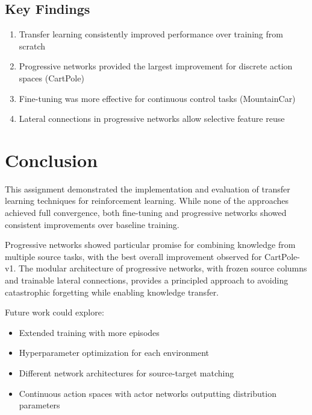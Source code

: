 \documentclass[11pt,a4paper]{article}
\begin{document}
\subsection{Key Findings}

\begin{enumerate}
    \item Transfer learning consistently improved performance over training from scratch
    \item Progressive networks provided the largest improvement for discrete action spaces (CartPole)
    \item Fine-tuning was more effective for continuous control tasks (MountainCar)
    \item Lateral connections in progressive networks allow selective feature reuse
\end{enumerate}

\section{Conclusion}

This assignment demonstrated the implementation and evaluation of transfer learning techniques for reinforcement learning. While none of the approaches achieved full convergence, both fine-tuning and progressive networks showed consistent improvements over baseline training.

Progressive networks showed particular promise for combining knowledge from multiple source tasks, with the best overall improvement observed for CartPole-v1. The modular architecture of progressive networks, with frozen source columns and trainable lateral connections, provides a principled approach to avoiding catastrophic forgetting while enabling knowledge transfer.

Future work could explore:
\begin{itemize}
    \item Extended training with more episodes
    \item Hyperparameter optimization for each environment
    \item Different network architectures for source-target matching
    \item Continuous action spaces with actor networks outputting distribution parameters
\end{itemize}
\end{document}
